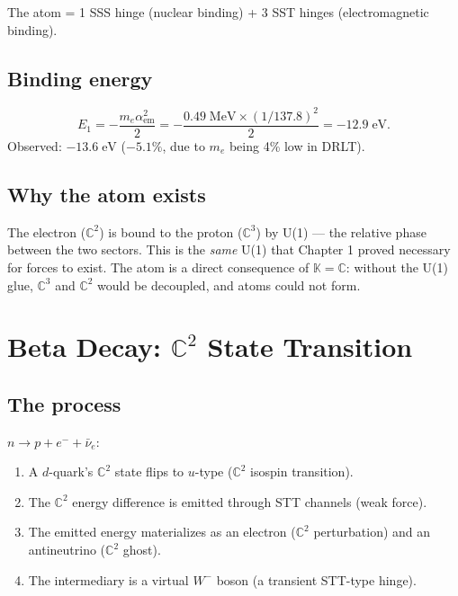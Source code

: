 \documentclass[12pt]{article}
\theoremstyle{remark}
\begin{document}
The atom = 1 SSS hinge (nuclear binding) + 3 SST hinges (electromagnetic binding).

\subsection{Binding energy}

\begin{equation}
E_1 = -\frac{m_e \alpha_\text{em}^2}{2} = -\frac{0.49\;\text{MeV} \times (1/137.8)^2}{2} = -12.9\;\text{eV}.
\end{equation}
Observed: $-13.6\;\text{eV}$ ($-5.1\%$, due to $m_e$ being 4\% low in DRLT).

\subsection{Why the atom exists}

The electron ($\mathbb{C}^2$) is bound to the proton ($\mathbb{C}^3$) by U(1) --- the relative phase between the two sectors. This is the \emph{same} U(1) that Chapter 1 proved necessary for forces to exist. The atom is a direct consequence of $\mathbb{K} = \mathbb{C}$: without the U(1) glue, $\mathbb{C}^3$ and $\mathbb{C}^2$ would be decoupled, and atoms could not form.

\section{Beta Decay: $\mathbb{C}^2$ State Transition}

\subsection{The process}

$n \to p + e^- + \bar{\nu}_e$:
\begin{enumerate}
\item A $d$-quark's $\mathbb{C}^2$ state flips to $u$-type ($\mathbb{C}^2$ isospin transition).
\item The $\mathbb{C}^2$ energy difference is emitted through STT channels (weak force).
\item The emitted energy materializes as an electron ($\mathbb{C}^2$ perturbation) and an antineutrino ($\mathbb{C}^2$ ghost).
\item The intermediary is a virtual $W^-$ boson (a transient STT-type hinge).
\end{enumerate}
\end{document}
